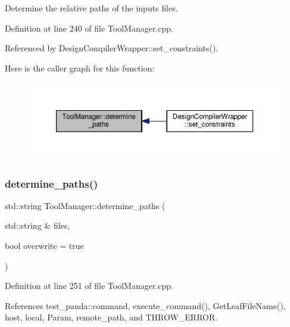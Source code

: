 Determine the relative paths of the inputs files. 



Definition at line 240 of file Tool\+Manager.\+cpp.



Referenced by Design\+Compiler\+Wrapper\+::set\+\_\+constraints().

Here is the caller graph for this function\+:
\nopagebreak
\begin{figure}[H]
\begin{center}
\leavevmode
\includegraphics[width=350pt]{dc/dc5/classToolManager_a7973f93d141a5e61f42cf681c97c59e5_icgraph}
\end{center}
\end{figure}
\mbox{\label{classToolManager_a0df8be838f09893c5eaefe22841b23b8}} 
\subsubsection{\texorpdfstring{determine\+\_\+paths()}{determine\_paths()}\hspace{0.1cm}{\footnotesize\ttfamily [2/2]}}
{\footnotesize\ttfamily std\+::string Tool\+Manager\+::determine\+\_\+paths (\begin{DoxyParamCaption}\item[{std\+::string \&}]{files,  }\item[{bool}]{overwrite = {\ttfamily true} }\end{DoxyParamCaption})}



Definition at line 251 of file Tool\+Manager.\+cpp.



References test\+\_\+panda\+::command, execute\+\_\+command(), Get\+Leaf\+File\+Name(), host, local, Param, remote\+\_\+path, and T\+H\+R\+O\+W\+\_\+\+E\+R\+R\+OR.

